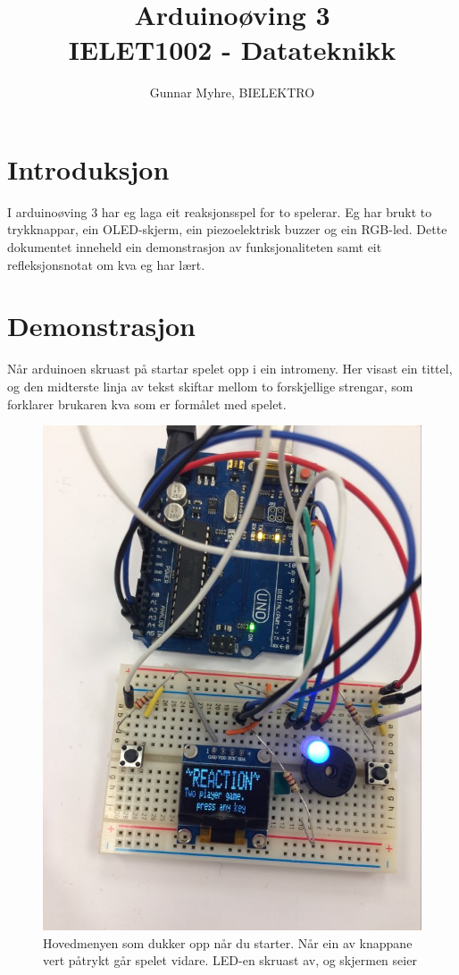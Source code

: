 \documentclass[journal]{IEEEtran}
\title{%
  Arduinoøving 3 \\
  \large IELET1002 - Datateknikk \\
  }
\author{Gunnar Myhre, BIELEKTRO}
\begin{document}
  \maketitle
  \section{Introduksjon}
  I arduinoøving 3 har eg laga eit reaksjonsspel for to spelerar. Eg har brukt to trykknappar,
  ein OLED-skjerm, ein piezoelektrisk buzzer og ein RGB-led. Dette dokumentet inneheld ein
  demonstrasjon av funksjonaliteten samt eit refleksjonsnotat om kva eg har lært.
  \section{Demonstrasjon}
  Når arduinoen skruast på startar spelet opp i ein intromeny. Her visast ein tittel, og
  den midterste linja av tekst skiftar mellom to forskjellige strengar, som forklarer brukaren
  kva som er formålet med spelet.
  \begin{figure}[!h]
    \begin{center}
      \includegraphics[scale=0.2]{03_menu}
      \caption{Hovedmenyen som dukker opp når du starter.  Når ein av knappane
      vert påtrykt går spelet vidare. LED-en skruast av, og skjermen seier}
    \end{center}
  \end{figure}
\end{document}

